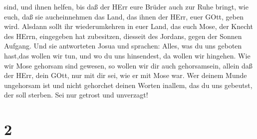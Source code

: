 sind, und ihnen helfen,  bis daß der HErr eure Brüder auch
zur Ruhe bringt, wie euch, daß sie aucheinnehmen das Land, das ihnen der
HErr, euer GOtt, geben wird. Alsdann sollt ihr wiederumkehren in euer
Land, das euch Mose, der Knecht des HErrn, eingegeben hat zubesitzen,
diesseit des Jordans, gegen der Sonnen Aufgang.  Und sie
antworteten Josua und sprachen: Alles, was du uns geboten hast,das
wollen wir tun, und wo du uns hinsendest, da wollen wir hingehen.
 Wie wir Mose gehorsam sind gewesen, so wollen wir dir auch
gehorsamsein, allein daß der HErr, dein GOtt, nur mit dir sei, wie er
mit Mose war.  Wer deinem Munde ungehorsam ist und nicht
gehorchet deinen Worten inallem, das du uns gebeutst, der soll sterben.
Sei nur getrost und unverzagt!

\hypertarget{section-1}{%
\section{2}\label{section-1}}

